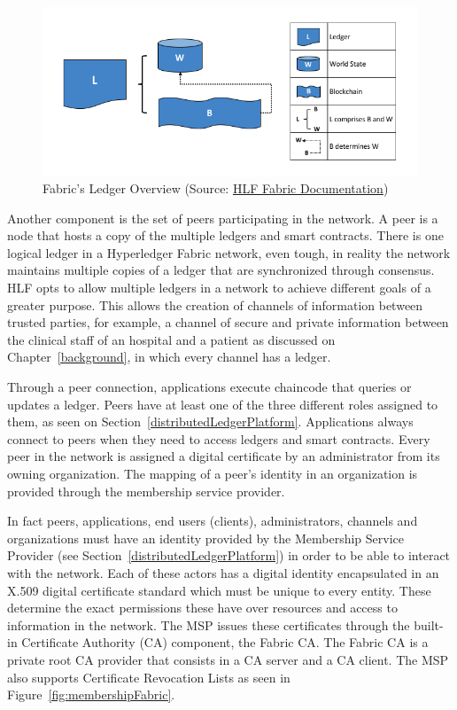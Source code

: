 \begin{figure}[ht] 
	\centering
	\includegraphics[width=1\linewidth]{imgs/ledgerFabric.png}
  \caption{\label{fig:ledgerFabric}Fabric's Ledger Overview (Source:
  \href{https://hyperledger-fabric.readthedocs.io/en/release-1.2/ledger/ledger.html}{HLF
  Fabric Documentation})}
\end{figure}

Another component is the set of peers participating in the network. A peer is a
node that hosts a copy of the multiple ledgers and smart contracts. There is
one logical ledger in a Hyperledger Fabric network, even tough, in reality the
network maintains multiple copies of a ledger that are synchronized through
consensus. HLF opts to allow multiple ledgers in a network to achieve different
goals of a greater purpose. This allows the creation of channels of information
between trusted parties, for example, a channel of secure and private
information between the clinical staff of an hospital and a patient as
discussed on Chapter~\ref{background}, in which every channel has a ledger.

Through a peer connection, applications execute chaincode that queries or
updates a ledger. Peers have at least one of the three different roles assigned
to them, as seen on Section~\ref{distributedLedgerPlatform}. Applications
always connect to peers when they need to access ledgers and smart contracts.
Every peer in the network is assigned a digital certificate by an administrator
from its owning organization. The mapping of a peer's identity in an
organization is provided through the membership service provider. 

In fact peers, applications, end users (clients), administrators, channels and
organizations must have an identity provided by the Membership Service Provider (see Section~\ref{distributedLedgerPlatform}) in order to be able to
interact with the network. Each of these actors has a digital identity
encapsulated in an X.509 digital certificate standard which must be unique to
every entity. These determine the exact permissions these have over resources
and access to information in the network. The MSP issues these certificates
through the built-in Certificate Authority (CA) component, the Fabric CA. The
Fabric CA is a private root CA provider that consists in a CA server and a CA
client. The MSP also supports Certificate Revocation Lists as seen in
Figure~\ref{fig:membershipFabric}.

